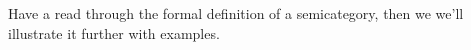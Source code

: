 Have a read through the formal definition of a semicategory, then we we'll illustrate it further with examples.
